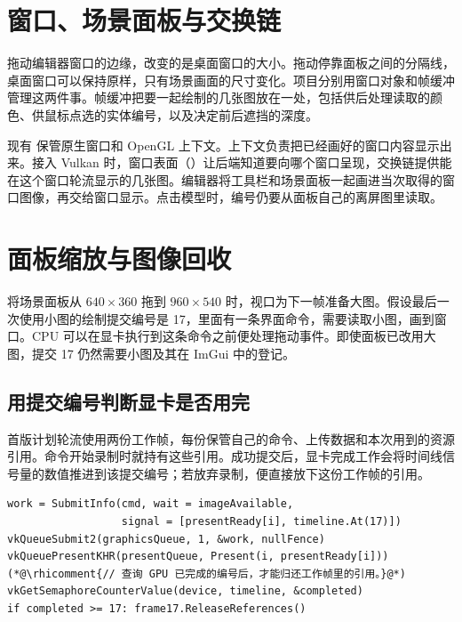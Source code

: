 \clearpage
\section{窗口、场景面板与交换链}\label{sec:windowresources}
拖动编辑器窗口的边缘，改变的是桌面窗口的大小。拖动停靠面板之间的分隔线，桌面窗口可以保持原样，只有场景画面的尺寸变化。项目分别用窗口对象和帧缓冲管理这两件事。帧缓冲把要一起绘制的几张图放在一处，包括供后处理读取的颜色、供鼠标点选的实体编号，以及决定前后遮挡的深度。


现有  保管原生窗口和 OpenGL 上下文。上下文负责把已经画好的窗口内容显示出来。接入 Vulkan 时，窗口表面（）让后端知道要向哪个窗口呈现，交换链提供能在这个窗口轮流显示的几张图。编辑器将工具栏和场景面板一起画进当次取得的窗口图像，再交给窗口显示。点击模型时，编号仍要从面板自己的离屏图里读取。

\clearpage
\section{面板缩放与图像回收}\label{sec:recycle}
将场景面板从 $640\times360$ 拖到 $960\times540$ 时，视口为下一帧准备大图。假设最后一次使用小图的绘制提交编号是 17，里面有一条界面命令，需要读取小图，画到窗口。CPU 可以在显卡执行到这条命令之前便处理拖动事件。即使面板已改用大图，提交 17 仍然需要小图及其在 ImGui 中的登记。


\subsection{用提交编号判断显卡是否用完}
首版计划轮流使用两份工作帧，每份保管自己的命令、上传数据和本次用到的资源引用。命令开始录制时就持有这些引用。成功提交后，显卡完成工作会将时间线信号量的数值推进到该提交编号；若放弃录制，便直接放下这份工作帧的引用。
\begin{lstlisting}
work = SubmitInfo(cmd, wait = imageAvailable,
                  signal = [presentReady[i], timeline.At(17)])
vkQueueSubmit2(graphicsQueue, 1, &work, nullFence)
vkQueuePresentKHR(presentQueue, Present(i, presentReady[i]))
(*@\rhicomment{// 查询 GPU 已完成的编号后，才能归还工作帧里的引用。}@*)
vkGetSemaphoreCounterValue(device, timeline, &completed)
if completed >= 17: frame17.ReleaseReferences()
\end{lstlisting}

